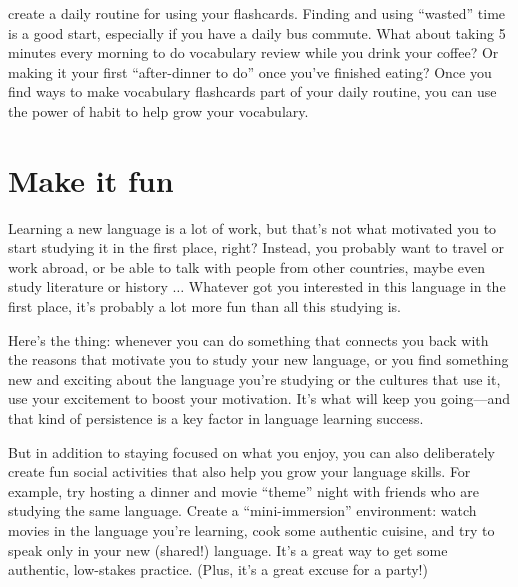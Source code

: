\documentclass[../main.tex]{subfiles}
\begin{document}
\begin{cuenotes}
{    create a daily routine for using your flashcards. Finding and using “wasted”
    time is a good start, especially if you have a daily bus commute. What about
    taking 5 minutes every morning to do vocabulary review while you drink your
    coffee? Or making it your first “after-dinner to do” once you’ve finished
    eating? Once you find ways to make vocabulary flashcards part of your daily
    routine, you can use the power of habit to help grow your vocabulary.
  }
\end{cuenotes}
%
\section{Make it fun}
Learning a new language is a lot of work, but that’s not what motivated you to
start studying it in the first place, right? Instead, you probably want to
travel or work abroad, or be able to talk with people from other countries,
maybe even study literature or history $ \ldots $ Whatever got you interested in this
language in the first place, it’s probably a lot more fun than all this studying
is.

Here’s the thing: whenever you can do something that connects you back with the
reasons that motivate you to study your new language, or you find something new
and exciting about the language you’re studying or the cultures that use it, use
your excitement to boost your motivation. It’s what will keep you going—and that
kind of persistence is a key factor in language learning success.

But in addition to staying focused on what you enjoy, you can also deliberately
create fun social activities that also help you grow your language skills. For
example, try hosting a dinner and movie “theme” night with friends who are
studying the same language. Create a “mini-immersion” environment: watch movies
in the language you’re learning, cook some authentic cuisine, and try to speak
only in your new (shared!) language. It’s a great way to get some authentic,
low-stakes practice. (Plus, it’s a great excuse for a party!)
%
\end{document}
